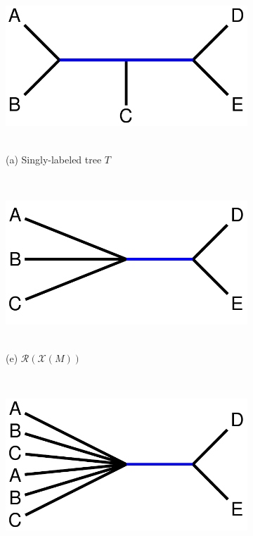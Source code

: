 \begin{figure}[!h]
	\vspace{24pt}

	\begin{subfigure}[t]{0.3\textwidth}
		\centering
		\includegraphics[width=\textwidth]{figures/fastmulrfs-fig1a.pdf}
		~
		\caption{(a) Singly-labeled tree $T$}
	\end{subfigure}
	~~~~
	\begin{subfigure}[t]{0.3\textwidth}
		\centering
		\includegraphics[width=\textwidth]{figures/fastmulrfs-fig1e.pdf}
		~
		\caption{(e) $\mathcal{R}(\mathcal{X}(M))$}
	\end{subfigure}
	~~~~
	\begin{subfigure}[t]{0.3\textwidth}
		\centering
		\includegraphics[width=\textwidth]{figures/fastmulrfs-fig1d.pdf}

\end{subfigure}
\end{figure}
